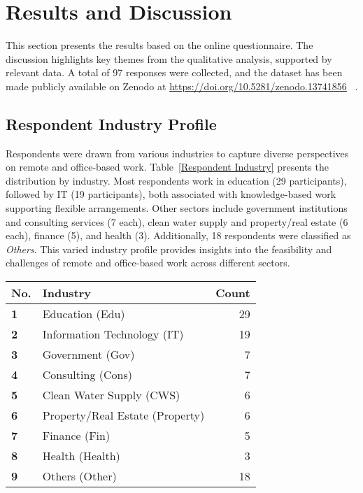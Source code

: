 \documentclass{infotel}
\begin{document}
\section{Results and Discussion}
\label{sec:results}

This section presents the results based on the online questionnaire. The discussion highlights key themes from the qualitative analysis, supported by relevant data. A total of 97 responses were collected, and the dataset has been made publicly available on Zenodo at
\url{https://doi.org/10.5281/zenodo.13741856}
~\cite{yohannis2024wfo}.


\subsection{Respondent Industry Profile}
\label{sec:respondent-industry}

Respondents were drawn from various industries to capture diverse perspectives on remote and office-based work. Table~\ref{Respondent Industry} presents the distribution by industry. Most respondents work in education (29 participants), followed by IT (19 participants), both associated with knowledge-based work supporting flexible arrangements. Other sectors include government institutions and consulting services (7 each), clean water supply and property/real estate (6 each), finance (5), and health (3). Additionally, 18 respondents were classified as \textit{Others}. This varied industry profile provides insights into the feasibility and challenges of remote and office-based work across different sectors.

\renewcommand{\arraystretch}{1.3}
\begin{table*}[ht]
	\centering
	\caption{Number of Respondents per Industry}
	\label{Respondent Industry}
	\begin{tabular}{p{} p{} r}
		\hline
		\textbf{No.} & \textbf{Industry} & \textbf{Count} \\ 
		\hline
		\textbf{1} & Education (Edu) & 29 \\ 
		\textbf{2} & Information Technology (IT) & 19 \\ 
		\textbf{3} & Government (Gov) & 7 \\ 
		\textbf{4} & Consulting (Cons) & 7 \\ 
		\textbf{5} & Clean Water Supply (CWS) & 6 \\ 
		\textbf{6} & Property/Real Estate (Property) & 6 \\ 
		\textbf{7} & Finance (Fin) & 5 \\ 
		\textbf{8} & Health (Health) & 3 \\ 
		\textbf{9} & Others (Other) & 18 \\ 
		\hline
	\end{tabular}
\end{table*}
\end{document}
